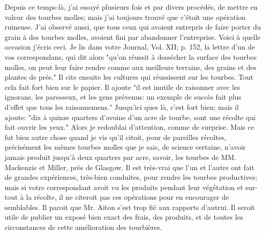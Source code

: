Depuis ce temps-là, j'ai essayé plusieurs fois et par divers procédés, de mettre en valeur des tourbes molles; mais j'ai toujours trouvé que c'étoit une opération ruineuse. J'ai observé aussi, que tous ceux qui avoient entrepris de faire porter du grain à des tourbes molles, avoient fini par abandonner l'entreprise.
Voici à quelle occasion j'écris ceci. Je lis dans votre Journal, Vol. XII; p. 152, la lettre d'un de vos correspondans, qui dit alors "qu'on réussit à dessécher la surface des tourbes molles, on peut leur faire rendre comme aux meilleurs terrains, des grains et des plantes de prés." Il cite ensuite les cultures qui réussissent sur les tourbes. Tout cela fait fort bien sur le papier. Il ajoute "il est inutile de raisonner avec les ignorans, les paresseux, et les gens prévenus: un exemple de succès fait plus d'effet que tous les raisonnemens." Jusqu'ici\setcounter{page}{458} ques là, c'est fort bien; mais il ajoute: "dix à quinze quarters d'avoine d'un acre de tourbe, sont une récolte qui fait ouvrir les yeux." Alors je redoublai d'attention, comme de surprise. Mais ce fut bien autre chose quand je vis qu'il citoit, pour de pareilles récoltes, précisément les mêmes tourbes molles que je sais, de science certaine, n'avoir jamais produit jusqu'à deux quarters par acre, savoir, les tourbes de MM. Mackenzie et Miller, près de Glasgow. Il est très-vrai que l'un et l'autre ont fait de grandes expériences, très-bien conduites, pour rendre les tourbes productives; mais si votre correspondant avoit vu les produits pendant leur végétation et sur-tout à la récolte, il ne citeroit pas ces opérations pour en encourager de semblables. Il paroit que Mr. Aiton s'est trop fié aux rapports d'autrui. Il seroit utile de publier un exposé bien exact des frais, des produits, et de toutes les circonstances de cette amélioration des tourbières.
